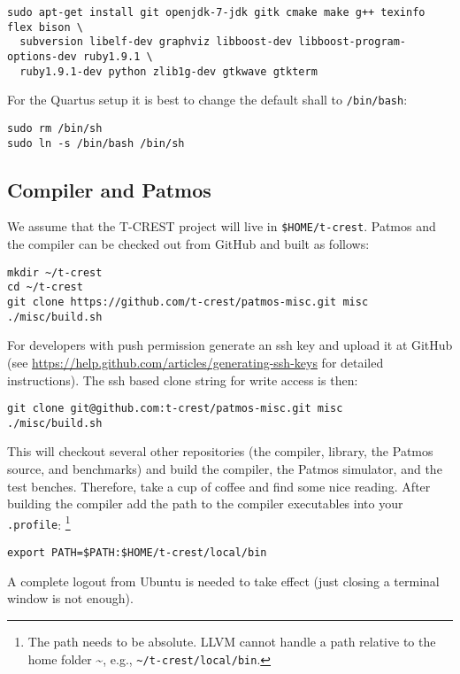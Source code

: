 \documentclass[a4paper,fontsize=10pt,twoside,DIV15,BCOR12mm,headinclude=true,footinclude=false,pagesize,bibtotoc]{scrbook}
\newcommand{\code}[1]{{\texttt{#1}}}
\begin{document}
\begin{verbatim}
sudo apt-get install git openjdk-7-jdk gitk cmake make g++ texinfo flex bison \
  subversion libelf-dev graphviz libboost-dev libboost-program-options-dev ruby1.9.1 \
  ruby1.9.1-dev python zlib1g-dev gtkwave gtkterm
\end{verbatim}

For the Quartus setup it is best to change the default shall to \code{/bin/bash}:

\begin{verbatim}
sudo rm /bin/sh
sudo ln -s /bin/bash /bin/sh
\end{verbatim}

\subsection{Compiler and Patmos}

We assume that the T-CREST project will live in \code{\$HOME/t-crest}.
Patmos and the compiler can be checked out from GitHub and built as follows:

\begin{verbatim}
mkdir ~/t-crest
cd ~/t-crest
git clone https://github.com/t-crest/patmos-misc.git misc
./misc/build.sh
\end{verbatim}

For developers with push permission generate an ssh key and upload
it at GitHub (see \url{https://help.github.com/articles/generating-ssh-keys}
for detailed instructions).
The ssh based clone string for write access is then:

\begin{verbatim}
git clone git@github.com:t-crest/patmos-misc.git misc
./misc/build.sh
\end{verbatim}

This will checkout several other repositories (the compiler, library,
the Patmos source, and benchmarks) and
build the compiler, the Patmos simulator, and the test benches.
Therefore, take a cup of coffee and find some nice reading.
After building the compiler add the path
to the compiler executables into your \code{.profile}:
\footnote{The path needs to be absolute. LLVM cannot handle
a path relative to the home folder \textasciitilde{}, e.g., \code{\textasciitilde{}/t-crest/local/bin}.}

\begin{verbatim}
export PATH=$PATH:$HOME/t-crest/local/bin
\end{verbatim}

A complete logout from Ubuntu is needed to take effect (just closing
a terminal window is not enough).
\end{document}
